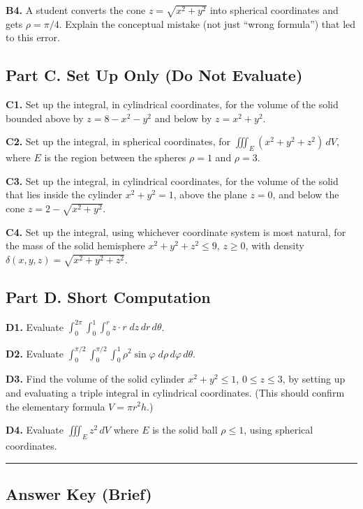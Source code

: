 \documentclass[11pt]{article}
\begin{document}
\textbf{B4.} A student converts the cone $z=\sqrt{x^2+y^2}$ into spherical coordinates and gets $\rho=\pi/4$. Explain the conceptual mistake (not just ``wrong formula'') that led to this error.

\subsection*{\textbf{Part C}. Set Up Only (Do Not Evaluate)}

\textbf{C1.} Set up the integral, in cylindrical coordinates, for the volume of the solid bounded above by $z=8-x^2-y^2$ and below by $z=x^2+y^2$.

\textbf{C2.} Set up the integral, in spherical coordinates, for $\iiint_E (x^2+y^2+z^2)\, dV$, where $E$ is the region between the spheres $\rho=1$ and $\rho=3$.

\textbf{C3.} Set up the integral, in cylindrical coordinates, for the volume of the solid that lies inside the cylinder $x^2+y^2=1$, above the plane $z=0$, and below the cone $z=2-\sqrt{x^2+y^2}$.

\textbf{C4.} Set up the integral, using whichever coordinate system is most natural, for the mass of the solid hemisphere $x^2+y^2+z^2\leq 9$, $z\geq 0$, with density $\delta(x,y,z)=\sqrt{x^2+y^2+z^2}$.

\subsection*{\textbf{ Part D}. Short Computation}

\textbf{D1.} Evaluate $\displaystyle\int_0^{2\pi}\int_0^1\int_0^r z\cdot r\; dz\, dr\, d\theta$.

\textbf{D2.} Evaluate $\displaystyle\int_0^{\pi/2}\int_0^{\pi/2}\int_0^1 \rho^2\sin\varphi\; d\rho\, d\varphi\, d\theta$.

\textbf{D3.} Find the volume of the solid cylinder $x^2+y^2\leq 1$, $0\leq z\leq 3$, by setting up and evaluating a triple integral in cylindrical coordinates. (This should confirm the elementary formula $V=\pi r^2 h$.)

\textbf{D4.} Evaluate $\iiint_E z^2\, dV$ where $E$ is the solid ball $\rho\leq 1$, using spherical coordinates.

\bigskip
\hrule
\bigskip

\subsection*{Answer Key (Brief)}
\end{document}
